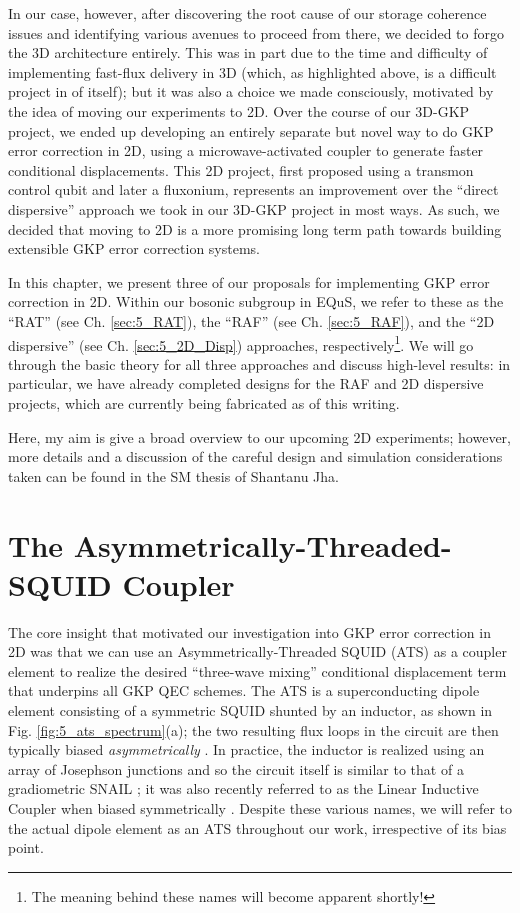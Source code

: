 In our case, however, after discovering the root cause of our storage coherence issues and identifying various avenues to proceed from there, we decided to forgo the 3D architecture entirely. This was in part due to the time and difficulty of implementing fast-flux delivery in 3D (which, as highlighted above, is a difficult project in of itself); but it was also a choice we made consciously, motivated by the idea of moving our experiments to 2D. Over the course of our 3D-GKP project, we ended up developing an entirely separate but novel way to do GKP error correction in 2D, using a microwave-activated coupler to generate faster conditional displacements. This 2D project, first proposed using a transmon control qubit and later a fluxonium, represents an improvement over the ``direct dispersive'' approach we took in our 3D-GKP project in most ways. As such, we decided that moving to 2D is a more promising long term path towards building extensible GKP error correction systems. 

In this chapter, we present three of our proposals for implementing GKP error correction in 2D. Within our bosonic subgroup in EQuS, we refer to these as the ``RAT'' (see Ch. \ref{sec:5_RAT}), the ``RAF'' (see Ch. \ref{sec:5_RAF}), and the ``2D dispersive'' (see Ch. \ref{sec:5_2D_Disp}) approaches, respectively\footnote{The meaning behind these names will become apparent shortly!}. We will go through the basic theory for all three approaches and discuss high-level results: in particular, we have already completed designs for the RAF and 2D dispersive projects, which are currently being fabricated as of this writing. 

Here, my aim is give a broad overview to our upcoming 2D experiments; however, more details and a discussion of the careful design and simulation considerations taken can be found in the SM thesis of Shantanu Jha. 
\clearpage


\section{The Asymmetrically-Threaded-SQUID Coupler \label{sec:5_RAT}}

The core insight that motivated our investigation into GKP error correction in 2D was that we can use an Asymmetrically-Threaded SQUID (ATS) as a coupler element to realize the desired ``three-wave mixing'' conditional displacement term that underpins all GKP QEC schemes. The ATS is a superconducting dipole element consisting of a symmetric SQUID shunted by an inductor, as shown in Fig. \ref{fig:5_ats_spectrum}(a); the two resulting flux loops in the circuit are then typically biased \textit{asymmetrically} \cite{lescanne2020exponential, berdou2023one}. In practice, the inductor is realized using an array of Josephson junctions and so the circuit itself is similar to that of a gradiometric SNAIL \cite{miano2022frequency}; it was also recently referred to as the Linear Inductive Coupler when biased symmetrically \cite{maiti2024ancilla}. Despite these various names, we will refer to the actual dipole element as an ATS throughout our work, irrespective of its bias point. 

